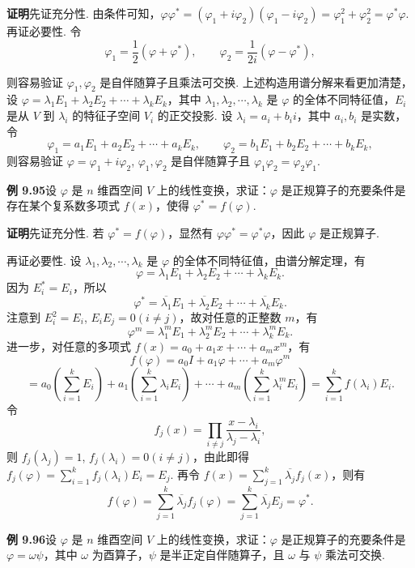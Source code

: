 \documentclass[UTF8, 12pt, fontset=fandol, oneside]{ctexart}
\begin{document}
\noindent\textbf{证明}\quad 先证充分性. 由条件可知，$\varphi\varphi^*=(\varphi_1+i\varphi_2)(\varphi_1-i\varphi_2)=\varphi_1^2+\varphi_2^2=\varphi^*\varphi$.
再证必要性. 令
\[
\varphi_1=\frac12(\varphi+\varphi^*),\qquad
\varphi_2=\frac1{2i}(\varphi-\varphi^*),
\]

则容易验证 $\varphi_1,\varphi_2$ 是自伴随算子且乘法可交换. 上述构造用谱分解来看更加清楚，设 $\varphi=\lambda_1E_1+\lambda_2E_2+\cdots+\lambda_kE_k$，其中 $\lambda_1,\lambda_2,\cdots,\lambda_k$ 是 $\varphi$ 的全体不同特征值，$E_i$ 是从 $V$ 到 $\lambda_i$ 的特征子空间 $V_i$ 的正交投影. 设 $\lambda_i=a_i+b_ii$，其中 $a_i,b_i$ 是实数，令
\[
\varphi_1=a_1E_1+a_2E_2+\cdots+a_kE_k,\qquad
\varphi_2=b_1E_1+b_2E_2+\cdots+b_kE_k,
\]
则容易验证 $\varphi=\varphi_1+i\varphi_2$, $\varphi_1,\varphi_2$ 是自伴随算子且 $\varphi_1\varphi_2=\varphi_2\varphi_1$.

\noindent\textbf{例 9.95}\quad 设 $\varphi$ 是 $n$ 维酉空间 $V$ 上的线性变换，求证：$\varphi$ 是正规算子的充要条件是存在某个复系数多项式 $f(x)$，使得 $\varphi^*=f(\varphi)$.

\noindent\textbf{证明}\quad 先证充分性. 若 $\varphi^*=f(\varphi)$，显然有 $\varphi\varphi^*=\varphi^*\varphi$，因此 $\varphi$ 是正规算子.

再证必要性. 设 $\lambda_1,\lambda_2,\cdots,\lambda_k$ 是 $\varphi$ 的全体不同特征值，由谱分解定理，有
\[
\varphi=\lambda_1E_1+\lambda_2E_2+\cdots+\lambda_kE_k.
\]
因为 $E_i^*=E_i$，所以
\[
\varphi^*=\overline{\lambda_1}E_1+\overline{\lambda_2}E_2+\cdots+\overline{\lambda_k}E_k.
\]
注意到 $E_i^2=E_i$, $E_iE_j=0(i\ne j)$，故对任意的正整数 $m$，有
\[
\varphi^m=\lambda_1^mE_1+\lambda_2^mE_2+\cdots+\lambda_k^mE_k.
\]
进一步，对任意的多项式 $f(x)=a_0+a_1x+\cdots+a_mx^m$，有
\[
f(\varphi)=a_0I+a_1\varphi+\cdots+a_m\varphi^m
\]
\[
=a_0\left(\sum_{i=1}^kE_i\right)+a_1\left(\sum_{i=1}^k\lambda_iE_i\right)+\cdots+a_m\left(\sum_{i=1}^k\lambda_i^mE_i\right)
=\sum_{i=1}^kf(\lambda_i)E_i.
\]
令
\[
f_j(x)=\prod_{i\ne j}\frac{x-\lambda_i}{\lambda_j-\lambda_i},
\]
则 $f_j(\lambda_j)=1$, $f_j(\lambda_i)=0(i\ne j)$，由此即得 $f_j(\varphi)=\sum_{i=1}^kf_j(\lambda_i)E_i=E_j$. 再令 $f(x)=\sum_{j=1}^k\overline{\lambda_j}f_j(x)$，则有
\[
f(\varphi)=\sum_{j=1}^k\overline{\lambda_j}f_j(\varphi)=\sum_{j=1}^k\overline{\lambda_j}E_j=\varphi^*.
\]

\noindent\textbf{例 9.96}\quad 设 $\varphi$ 是 $n$ 维酉空间 $V$ 上的线性变换，求证：$\varphi$ 是正规算子的充要条件是 $\varphi=\omega\psi$，其中 $\omega$ 为酉算子，$\psi$ 是半正定自伴随算子，且 $\omega$ 与 $\psi$ 乘法可交换.
\end{document}
